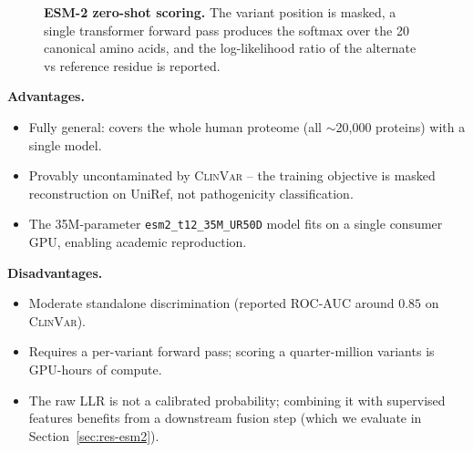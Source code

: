 \documentclass[11pt,a4paper,oneside]{report}
\begin{document}
\begin{figure}[htbp]
\centering
{}
\caption[ESM-2 zero-shot LLR]{\textbf{ESM-2 zero-shot scoring.}
The variant position is masked, a single transformer
forward pass produces the softmax over the 20 canonical
amino acids, and the log-likelihood ratio of the alternate
vs reference residue is reported.}
\label{fig:esm2-pipeline}
\end{figure}

\textbf{Advantages.}
\begin{itemize}[leftmargin=2em, itemsep=0.15em]
  \item Fully general: covers the whole human proteome
    (all $\sim$20{,}000 proteins) with a single model.
  \item Provably uncontaminated by \textsc{ClinVar} --
    the training objective is masked reconstruction on
    UniRef, not pathogenicity classification.
  \item The 35M-parameter \texttt{esm2\_t12\_35M\_UR50D}
    model fits on a single consumer GPU, enabling
    academic reproduction.
\end{itemize}

\textbf{Disadvantages.}
\begin{itemize}[leftmargin=2em, itemsep=0.15em]
  \item Moderate standalone discrimination
    (reported ROC-AUC around $0.85$ on \textsc{ClinVar}).
  \item Requires a per-variant forward pass; scoring a
    quarter-million variants is GPU-hours of compute.
  \item The raw LLR is not a calibrated probability;
    combining it with supervised features benefits from
    a downstream fusion step (which we evaluate in
    Section~\ref{sec:res-esm2}).
\end{itemize}
\end{document}
